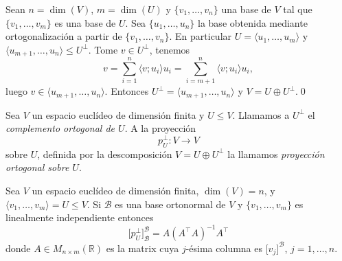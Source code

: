 \dem Sean $n=\dim(V)$, $m=\dim(U)$ y $\{v_1,\ldots,v_n\}$ una base de $V$ tal que $\{v_1,\ldots,v_m\}$ es una base de $U$. Sea $\{u_1,\ldots,u_n\}$ la base obtenida mediante ortogonalizaci\'on a partir de $\{v_1,\ldots,v_n\}$. En particular $U=\langle u_1,\ldots,u_m\rangle$ y $\langle u_{m+1},\ldots,u_n\rangle\le U^\perp$. Tome $v\in U^\perp$, tenemos
\[
v=\sum_{i=1}^n\langle v;u_i\rangle u_i=\sum_{i=m+1}^n\langle v;u_i\rangle u_i,
\]
luego $v\in\langle u_{m+1},\ldots,u_n\rangle$. Entonces $U^\perp=\langle u_{m+1},\ldots,u_n\rangle$ y $V=U\oplus U^\perp$.\qed

\begin{defn}
Sea $V$ un espacio eucl\'ideo de dimensi\'on finita y $U\le V$. Llamamos a $U^\perp$ el \emph{complemento ortogonal de $U$}. A la proyecci\'on
\[
p^\perp_U:V\longrightarrow V
\]
sobre $U$, definida por la descomposici\'on $V=U\oplus U^\perp$ la llamamos \emph{proyecci\'on ortogonal sobre $U$}.
\end{defn}

\begin{pro}
Sea $V$ un espacio eucl\'ideo de dimensi\'on finita, $\dim(V)=n$,  y $\langle v_1,\ldots,v_m\rangle=U\le V$. Si $\mathcal{B}$ es una base ortonormal de $V$ y $\{v_1,\ldots,v_m\}$ es linealmente independiente entonces
$$ \Big[p^\perp_U\Big]^{\mathcal{B}}_{\mathcal{B}}=A(A^\intercal A)^{-1}A^\intercal $$
donde $A\in M_{n\times m}(\mathbb{R})$ es la matrix cuya $j$-\'esima columna es $\Big[v_j\Big]^\mathcal{B}$, $j=1,\ldots,n$.
\end{pro}

